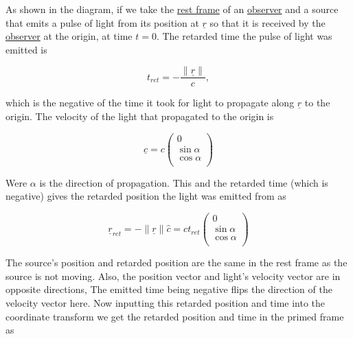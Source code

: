 As shown in the diagram, if we take the \hyperlink{def-proper-frame}{rest frame} of an \hyperlink{def-observer}{observer} and a source that emits a pulse of light from its position at ${\underline{r}}$ so that it is received by the \hyperlink{def-observer}{observer} at the origin, at time ${t} = 0$.
The retarded time the pulse of light was emitted is

\begin{equation}
	{{t}_{ret}} =-\frac{\|\underline{r}\|}{c},
\end{equation}

which is the negative of the time it took for light to propagate along ${\underline{r}}$ to the origin.
The velocity of the light that propagated to the origin is

\begin{equation}
	\underline{c} = {c}
	\begin{pmatrix}
		0            \\
		\sin{\alpha} \\
		\cos{\alpha} \\
	\end{pmatrix}
\end{equation}

Were ${\alpha}$ is the direction of propagation.
This and the retarded time (which is negative) gives the retarded position the light was emitted from as

\begin{equation}
	\underline{r}_{ret} = -\|\underline{r}\|\hat{c} ={c}{{{t}_{ret}}}
	\begin{pmatrix}
		0            \\
		\sin{\alpha} \\
		\cos{\alpha} \\
	\end{pmatrix}
\end{equation}

The source's position and retarded position are the same in the rest frame as the source is not moving.
Also, the position vector and light's velocity vector are in opposite directions, The emitted time being negative flips the direction of the velocity vector here.
Now inputting this retarded position and time into the coordinate transform we get the retarded position and time in the primed frame as

